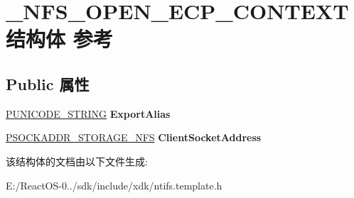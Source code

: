 \hypertarget{struct___n_f_s___o_p_e_n___e_c_p___c_o_n_t_e_x_t}{}\section{\+\_\+\+N\+F\+S\+\_\+\+O\+P\+E\+N\+\_\+\+E\+C\+P\+\_\+\+C\+O\+N\+T\+E\+X\+T结构体 参考}
\label{struct___n_f_s___o_p_e_n___e_c_p___c_o_n_t_e_x_t}
\subsection*{Public 属性}
\begin{DoxyCompactItemize}
\item 
\mbox{\label{struct___n_f_s___o_p_e_n___e_c_p___c_o_n_t_e_x_t_aa706d743cb599c79ab2e277292047afe}} 
\hyperlink{struct___u_n_i_c_o_d_e___s_t_r_i_n_g}{P\+U\+N\+I\+C\+O\+D\+E\+\_\+\+S\+T\+R\+I\+NG} {\bfseries Export\+Alias}
\item 
\mbox{\label{struct___n_f_s___o_p_e_n___e_c_p___c_o_n_t_e_x_t_a97a3ecf176879f9d7f052a06a84b2875}} 
\hyperlink{structsockaddr__storage}{P\+S\+O\+C\+K\+A\+D\+D\+R\+\_\+\+S\+T\+O\+R\+A\+G\+E\+\_\+\+N\+FS} {\bfseries Client\+Socket\+Address}
\end{DoxyCompactItemize}


该结构体的文档由以下文件生成\+:\begin{DoxyCompactItemize}
\item 
E\+:/\+React\+O\+S-\/0../sdk/include/xdk/ntifs.\+template.\+h\end{DoxyCompactItemize}
